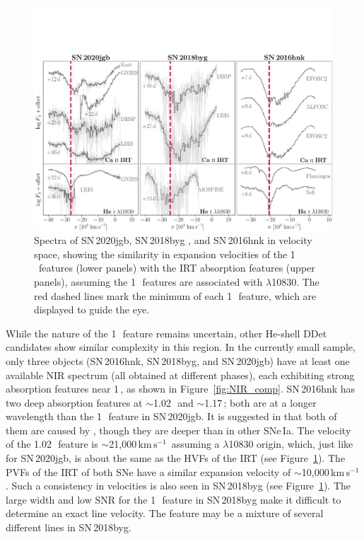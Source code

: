 \documentclass[twocolumn]{aastex631}
\newcommand{\sn}{SN\,2020jgb}
\newcommand{\kms}{$\mathrm{km}\,\mathrm{s}^{-1}$}
\begin{document}
\begin{figure}
    \centering
    \includegraphics[width=\textwidth]{CaII_HeI_hvf.pdf}
    \caption{Spectra of \sn, SN\,2018byg \citep{de_18byg_2019}, and SN\,2016hnk \citep{galbany_16hnk_2019} in velocity space, showing the similarity in expansion velocities of the 1\,\micron\ features (lower panels) with the  IRT absorption features (upper panels), assuming the 1\,\micron\ features are associated with  $\lambda$10830. The red dashed lines mark the minimum of each 1\,\micron\ feature, which are displayed to guide the eye.}
    \label{fig:hvf_comp}
\end{figure}

While the nature of the 1\,\micron\ feature remains uncertain, other He-shell DDet candidates show similar complexity in this region. In the currently small sample, only three objects (SN\,2016hnk, SN\,2018byg, and \sn) have at least one available NIR spectrum (all obtained at different phases), each exhibiting strong absorption features near 1\,\micron, as shown in Figure~\ref{fig:NIR_comp}. SN\,2016hnk has two deep absorption features at $\sim$1.02\,\micron\ and $\sim$1.17\,\micron; both are at a longer wavelength than the 1\,\micron\ feature in \sn. It is suggested in \citet{galbany_16hnk_2019} that both of them are caused by , though they are deeper than in other SNe\,Ia. The velocity of the 1.02\,\micron\ feature is $\sim$21,000\,\kms\ assuming a  $\lambda$10830 origin, which, just like for \sn, is about the same as the HVFs of the  IRT (see Figure~\ref{fig:hvf_comp}). The PVFs of the  IRT of both SNe have a similar expansion velocity of $\sim$10,000\,\kms. Such a consistency in velocities is also seen in SN\,2018byg (see Figure~\ref{fig:hvf_comp}). The large width and low SNR for the 1\,\micron\ feature in SN\,2018byg make it difficult to determine an exact line velocity. The feature may be a mixture of several different lines in SN\,2018byg.
\end{document}
